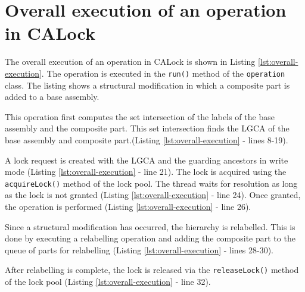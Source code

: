 \section{Overall execution of an operation in CALock}

The overall execution of an operation in CALock is shown in Listing \ref{lst:overall-execution}. The operation is executed in the \texttt{run()} method of the \texttt{operation} class. The listing shows a structural modification in which a composite part is added to a base assembly.

This operation first computes the set intersection of the labels of the base assembly and the composite part. This set intersection finds the LGCA of the base assembly and composite part.(Listing \ref{lst:overall-execution} - lines 8-19).

A lock request is created with the LGCA and the guarding ancestors in write mode (Listing \ref{lst:overall-execution} - line 21). The lock is acquired using the \texttt{acquireLock()} method of the lock pool. The thread waits for resolution as long as the lock is not granted (Listing \ref{lst:overall-execution} - line 24). Once granted, the operation is performed (Listing \ref{lst:overall-execution} - line 26).

Since a structural modification has occurred, the hierarchy is relabelled. This is done by executing a relabelling operation and adding the composite part to the queue of parts for relabelling (Listing \ref{lst:overall-execution} - lines 28-30). 

After relabelling is complete, the lock is released via the \texttt{releaseLock()} method of the lock pool (Listing \ref{lst:overall-execution} - line 32).


